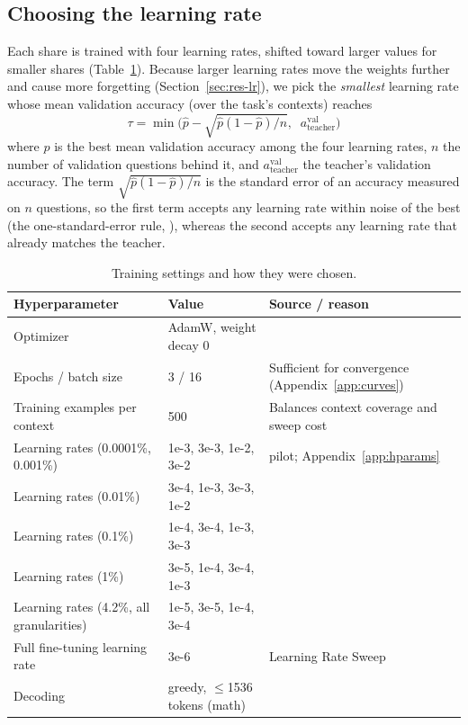 \documentclass{article} %
\begin{document}
\subsection{Choosing the learning rate}
Each share is trained with four learning rates, shifted toward larger values for smaller shares
(Table~\ref{tab:hparams}). Because larger learning rates move the weights further and cause more forgetting
(Section~\ref{sec:res-lr}), we pick the \emph{smallest} learning rate whose mean validation accuracy
(over the task's contexts) reaches
\begin{equation}
  \tau = \min\Big(\hat p - \sqrt{\hat p (1-\hat p)/n},\;\; a^{\text{val}}_{\text{teacher}}\Big)
  \label{eq:lrrule}
\end{equation}
where $\hat p$ is the best mean validation accuracy among the four learning rates, $n$ the number of
validation questions behind it, and $a^{\text{val}}_{\text{teacher}}$ the teacher's validation accuracy.
The term $\sqrt{\hat p(1-\hat p)/n}$ is the standard error of an accuracy measured on $n$ questions, so
the first term accepts any learning rate within noise of the best (the one-standard-error rule,
\citealp{hastie2009elements}), whereas the second accepts any learning rate that already matches the teacher.

\begin{table}[t]
  \centering\small
  \begin{tabular}{lll}
    \toprule
    Hyperparameter & Value & Source / reason \\
    \midrule
    Optimizer & AdamW, weight decay 0 & \citet{loshchilov2019adamw} \\
    Epochs / batch size & 3 / 16 & Sufficient for convergence (Appendix~\ref{app:curves}) \\
    Training examples per context & 500 & Balances context coverage and sweep cost \\
    Learning rates (0.0001\%, 0.001\%) & 1e-3, 3e-3, 1e-2, 3e-2 & pilot; Appendix~\ref{app:hparams} \\
    Learning rates (0.01\%) & 3e-4, 1e-3, 3e-3, 1e-2 & \\
    Learning rates (0.1\%) & 1e-4, 3e-4, 1e-3, 3e-3 & \\
    Learning rates (1\%) & 3e-5, 1e-4, 3e-4, 1e-3 & \\
    Learning rates (4.2\%, all granularities) & 1e-5, 3e-5, 1e-4, 3e-4 & \\
    Full fine-tuning learning rate & 3e-6 & Learning Rate Sweep \\
    Decoding & greedy, $\le$1536 tokens (math) & \citep{hendrycks2021math} \\ 
    \bottomrule
  \end{tabular}
  \caption{Training settings and how they were chosen.}
  \label{tab:hparams}
\end{table}
\end{document}
